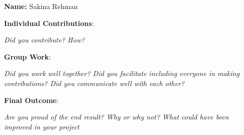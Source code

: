 \documentclass[report.tex]{subfiles}
\begin{document}
\noindent \textbf{Name:} Sakina Rehman \newline

\noindent \textbf{Individual Contributions}:

\noindent \emph{Did you contribute? How?} \newline

\noindent \textbf{Group Work}:

\noindent \emph{Did you work well together? Did you facilitate including everyone in making contributions? Did you communicate well with each other?} \newline

\noindent \textbf{Final Outcome}:

\noindent \emph{Are you proud of the end result? Why or why not? What could have been improved in your project} \newline
\end{document}
